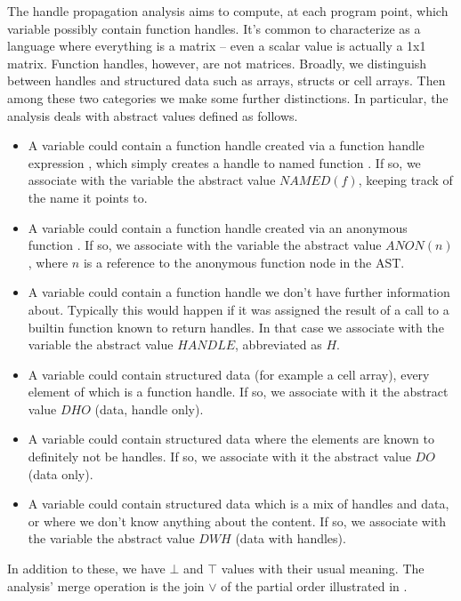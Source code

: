 The handle propagation analysis aims to compute, at each program point, which
variable possibly contain function handles. It's common to characterize
\matlab as a language where everything is a matrix -- even a scalar value is
actually a 1x1 matrix. Function handles, however, are not matrices. Broadly,
we distinguish between handles and structured data such as arrays, structs
or cell arrays. Then among these two categories we make some further
distinctions. In particular, the analysis deals with abstract values defined
as follows.

\begin{itemize}
  \item A variable could contain a function handle created via a function
    handle expression , which simply creates a handle to named
    function . If so, we associate with the variable the abstract value
    $NAMED(f)$, keeping track of the name it points to.
  \item A variable could contain a function handle created via an anonymous
    function . If so, we associate with the variable the
    abstract value $ANON(n)$, where $n$ is a reference to the
    anonymous function node in the AST.
  \item A variable could contain a function handle we don't have further
    information about. Typically this would happen if it was assigned the
    result of a call to a builtin function known to return handles. In that
    case we associate with the variable the abstract value $HANDLE$,
    abbreviated as $H$.
  \item A variable could contain structured data (for example a cell array),
    every element of which is a function handle. If so, we associate with it
    the abstract value $DHO$ (data, handle only).
  \item A variable could contain structured data where the elements are known
    to definitely not be handles. If so, we associate with it the abstract
    value $DO$ (data only).
  \item A variable could contain structured data which is a mix of handles
    and data, or where we don't know anything about the content. If so, we
    associate with the variable the abstract value $DWH$ (data with handles).
\end{itemize}

In addition to these, we have $\bot$ and $\top$ values with their
usual meaning. The analysis' merge operation is the join $\vee$ of the partial
order illustrated in .

